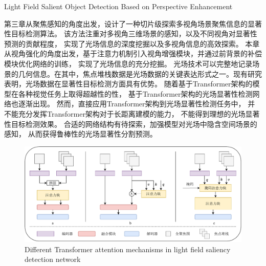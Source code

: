 %
%
%
%
%
%
%
%
%
%





{Light Field Salient Object Detection Based on Perspective Enhancement }

\label{chap:part4}
%
%
%
%
第三章从聚焦感知的角度出发，设计了一种切片级探索多视角场景聚焦信息的显著性目标检测算法。
该方法注重对多视角三维场景的感知，以及不同视角对显著性预测的贡献程度，
实现了光场信息的深度挖掘以及多视角信息的高效探索。
本章从视角强化的角度出发，基于注意力机制引入视角增强模块，并通过前背景的补偿模块优化网络的训练，
实现了光场信息的充分挖掘。
%
%
%
%
%
%
%
%
光场技术可以完整地记录场景的几何信息。在其中，焦点堆栈数据是光场数据的关键表达形式之一。现有研究表明，光场数据在显著性目标检测方面具有优势。
随着基于Transformer架构的模型在各种视觉任务上取得超越性的性，
基于Transformer架构的光场显著性检测网络也逐渐出现。
然而，直接应用Transformer架构到光场显著性检测任务中，
并不能充分发挥Transformer架构对于长距离建模的能力，
不能得到理想的光场显著性目标检测效果。
合适的网络结构有待探索，加强模型对光场中隐含空间场景的感知，
从而获得鲁棒性的光场显著性分割预测。




\begin{figure}[!ht]
	\centering
	\includegraphics[width=0.95\linewidth]{figures/chapter4/task2_ins.drawio}
	{Different Transformer attention mechanisms in light field saliency detection network}  
	\label{cpt4_fig1:task2_ins}
\end{figure}



